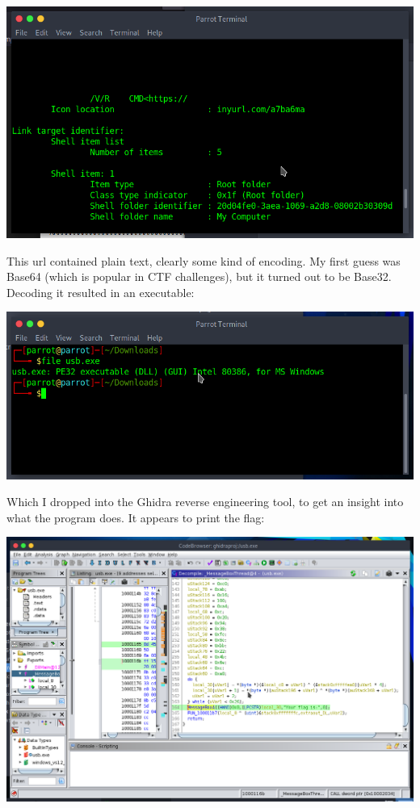 \documentclass{article}
\begin{document}
\noindent 
\begin{center}
\includegraphics[width=16cm]{usb-drive/screenshot3.png}
\end{center}

\noindent
This url contained plain text, clearly some kind of encoding. My first guess was Base64 (which is popular in CTF challenges), but it turned out to be Base32. Decoding it resulted in an executable:

\noindent 
\begin{center}
\includegraphics[width=16cm]{usb-drive/screenshot4.png}
\end{center}

\noindent
Which I dropped into the Ghidra reverse engineering tool, to get an insight into what the program does. It appears to print the flag: 

\noindent 
\begin{center}
\includegraphics[width=16cm]{usb-drive/screenshot5.png}
\end{center}
\end{document}
